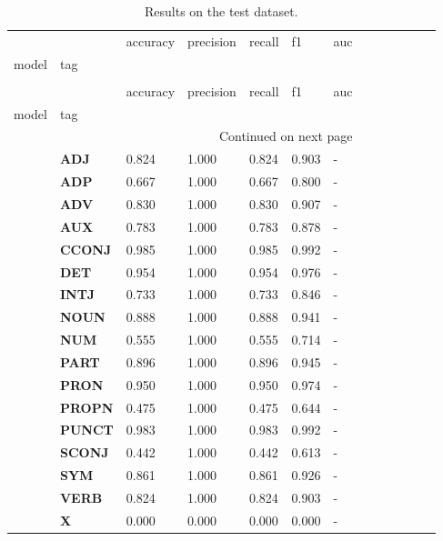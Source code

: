\begin{longtable}{|l||l||l||l||l||l||l||l||l||l||l||l||l|}
\caption{Results on the test dataset.} \label{tab::ex_3_test} \\
\toprule
 &  & accuracy & precision & recall & f1 & auc \\
model & tag &  &  &  &  &  \\
\midrule
\endfirsthead
\caption[]{Results on the test dataset.} \\
\toprule
 &  & accuracy & precision & recall & f1 & auc \\
model & tag &  &  &  &  &  \\
\midrule
\endhead
\midrule
\multicolumn{7}{r}{Continued on next page} \\
\midrule
\endfoot
\bottomrule
\endlastfoot
\multirow[t]{18}{*}{\textbf{Baseline}} & \textbf{ADJ} & 0.824 & 1.000 & 0.824 & 0.903 & - \\
\textbf{} & \textbf{ADP} & 0.667 & 1.000 & 0.667 & 0.800 & - \\
\textbf{} & \textbf{ADV} & 0.830 & 1.000 & 0.830 & 0.907 & - \\
\textbf{} & \textbf{AUX} & 0.783 & 1.000 & 0.783 & 0.878 & - \\
\textbf{} & \textbf{CCONJ} & 0.985 & 1.000 & 0.985 & 0.992 & - \\
\textbf{} & \textbf{DET} & 0.954 & 1.000 & 0.954 & 0.976 & - \\
\textbf{} & \textbf{INTJ} & 0.733 & 1.000 & 0.733 & 0.846 & - \\
\textbf{} & \textbf{NOUN} & 0.888 & 1.000 & 0.888 & 0.941 & - \\
\textbf{} & \textbf{NUM} & 0.555 & 1.000 & 0.555 & 0.714 & - \\
\textbf{} & \textbf{PART} & 0.896 & 1.000 & 0.896 & 0.945 & - \\
\textbf{} & \textbf{PRON} & 0.950 & 1.000 & 0.950 & 0.974 & - \\
\textbf{} & \textbf{PROPN} & 0.475 & 1.000 & 0.475 & 0.644 & - \\
\textbf{} & \textbf{PUNCT} & 0.983 & 1.000 & 0.983 & 0.992 & - \\
\textbf{} & \textbf{SCONJ} & 0.442 & 1.000 & 0.442 & 0.613 & - \\
\textbf{} & \textbf{SYM} & 0.861 & 1.000 & 0.861 & 0.926 & - \\
\textbf{} & \textbf{VERB} & 0.824 & 1.000 & 0.824 & 0.903 & - \\
\textbf{} & \textbf{X} & 0.000 & 0.000 & 0.000 & 0.000 & - \\

\end{longtable}
